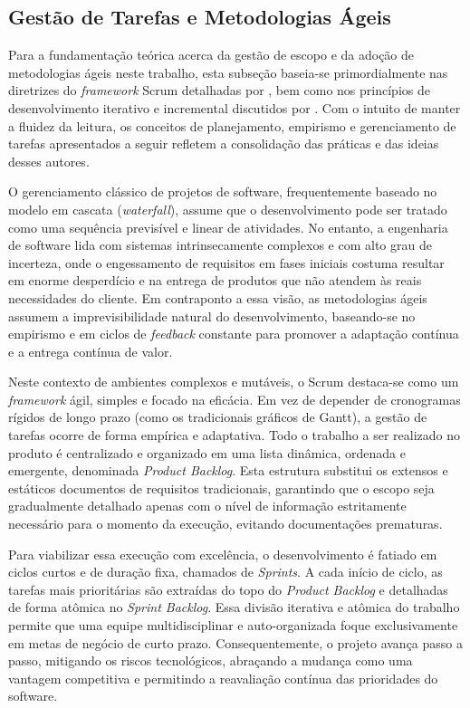 \subsection{Gestão de Tarefas e Metodologias Ágeis}

Para a fundamentação teórica acerca da gestão de escopo e da adoção de metodologias ágeis neste trabalho, esta subseção baseia-se primordialmente nas diretrizes do \textit{framework} Scrum detalhadas por , bem como nos princípios de desenvolvimento iterativo e incremental discutidos por . Com o intuito de manter a fluidez da leitura, os conceitos de planejamento, empirismo e gerenciamento de tarefas apresentados a seguir refletem a consolidação das práticas e das ideias desses autores. %

O gerenciamento clássico de projetos de software, frequentemente baseado no modelo em cascata (\textit{waterfall}), assume que o desenvolvimento pode ser tratado como uma sequência previsível e linear de atividades. No entanto, a engenharia de software lida com sistemas intrinsecamente complexos e com alto grau de incerteza, onde o engessamento de requisitos em fases iniciais costuma resultar em enorme desperdício e na entrega de produtos que não atendem às reais necessidades do cliente. Em contraponto a essa visão, as metodologias ágeis assumem a imprevisibilidade natural do desenvolvimento, baseando-se no empirismo e em ciclos de \textit{feedback} constante para promover a adaptação contínua e a entrega contínua de valor. %

Neste contexto de ambientes complexos e mutáveis, o Scrum destaca-se como um \textit{framework} ágil, simples e focado na eficácia. Em vez de depender de cronogramas rígidos de longo prazo (como os tradicionais gráficos de Gantt), a gestão de tarefas ocorre de forma empírica e adaptativa. Todo o trabalho a ser realizado no produto é centralizado e organizado em uma lista dinâmica, ordenada e emergente, denominada \textit{Product Backlog}. Esta estrutura substitui os extensos e estáticos documentos de requisitos tradicionais, garantindo que o escopo seja gradualmente detalhado apenas com o nível de informação estritamente necessário para o momento da execução, evitando documentações prematuras. %

Para viabilizar essa execução com excelência, o desenvolvimento é fatiado em ciclos curtos e de duração fixa, chamados de \textit{Sprints}. A cada início de ciclo, as tarefas mais prioritárias são extraídas do topo do \textit{Product Backlog} e detalhadas de forma atômica no \textit{Sprint Backlog}. Essa divisão iterativa e atômica do trabalho permite que uma equipe multidisciplinar e auto-organizada foque exclusivamente em metas de negócio de curto prazo. Consequentemente, o projeto avança passo a passo, mitigando os riscos tecnológicos, abraçando a mudança como uma vantagem competitiva e permitindo a reavaliação contínua das prioridades do software. %


